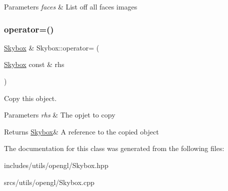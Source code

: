 \begin{DoxyParams}{Parameters}
{\em faces} & List off all faces images \\
\hline
\end{DoxyParams}
\mbox{\label{class_skybox_abf01cb7deeb5d0cee173b50c43f82161}} 
\subsubsection{\texorpdfstring{operator=()}{operator=()}}
{\footnotesize\ttfamily \hyperlink{class_skybox}{Skybox} \& Skybox\+::operator= (\begin{DoxyParamCaption}\item[{\hyperlink{class_skybox}{Skybox} const \&}]{rhs }\end{DoxyParamCaption})}



Copy this object. 


\begin{DoxyParams}{Parameters}
{\em rhs} & The opjet to copy \\
\hline
\end{DoxyParams}
\begin{DoxyReturn}{Returns}
\hyperlink{class_skybox}{Skybox}\& A reference to the copied object 
\end{DoxyReturn}


The documentation for this class was generated from the following files\+:\begin{DoxyCompactItemize}
\item 
includes/utils/opengl/Skybox.\+hpp\item 
srcs/utils/opengl/Skybox.\+cpp\end{DoxyCompactItemize}
